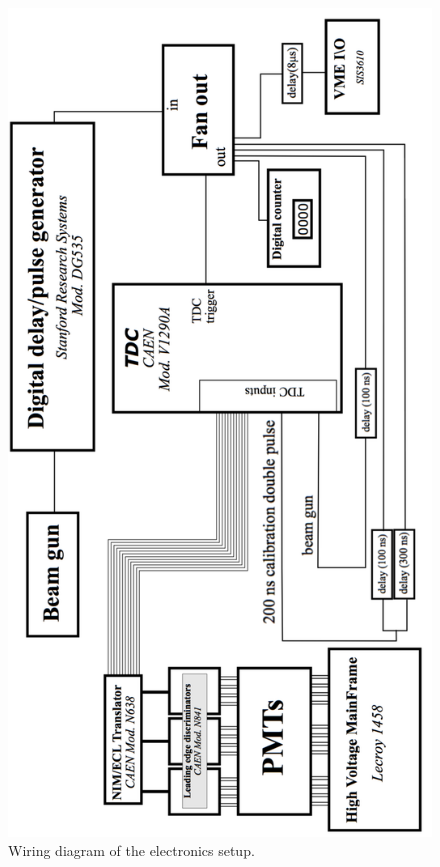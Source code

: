 \onecolumngrid
\begin{figure}[h]
\centering
\includegraphics[width=\textwidth, angle=\WireAngle]{WiringDiagram.png}
\caption{Wiring diagram of the electronics setup. }
\label{fig:WiringDiagram}
\end{figure}
\figWiringDiagramBarrier
\twocolumngrid

